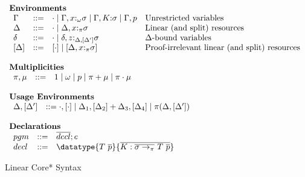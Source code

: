 \begin{figure}[h]
\begin{framed}
\[\begin{array}{l}
\begin{array}{lcll}
\end{array}\\\\
%
\textbf{Environments}\\
\begin{array}{lcll}
  \Gamma   & ::=  & \cdot \mid \Gamma,x{:}_\omega\sigma \mid \Gamma,K{:}\sigma \mid \Gamma,p & \textrm{Unrestricted variables} \\
  \Delta   & ::=  & \cdot \mid \Delta,x{:}_\pi\sigma                & \textrm{Linear (and split) resources} \\
  \delta   & ::=  & \cdot \mid \delta,z{:}_{\Delta,[\Delta']}\sigma & \textrm{$\Delta$-bound variables}\\
  \left[\Delta\right] & ::=  & \left[\cdot\right] \mid \left[\Delta,x{:}_\pi\sigma\right] & \textrm{Proof-irrelevant linear (and split) resources} \\
\end{array}\\\\
%
\textbf{Multiplicities}\\
\begin{array}{lcll}
  \pi, \mu & ::= & 1 \mid \omega \mid p \mid \pi + \mu \mid \pi \cdot \mu\\
\end{array}\\\\
%
\textbf{Usage Environments}\\
\begin{array}{lcl}
  \Delta,\left[\Delta'\right] & ::= \cdot,\left[\cdot\right]\mid\Delta_1,\left[\Delta_2\right]+\Delta_3,\left[\Delta_4\right] \mid \pi(\Delta,\left[\Delta'\right])\\
\end{array}\\\\
%
\textbf{Declarations}\\
\begin{array}{lcl}
  pgm & ::= & \overline{decl}; e \\
  decl & ::= & \datatype{T~\overline{p}}{\overline{K:\overline{\sigma \to_\pi}~T~\overline{p}}}
\end{array}
%
\end{array}
\]
\end{framed}
\caption{Linear Core* Syntax}
\label{linear-core-syntax}
\end{figure}

